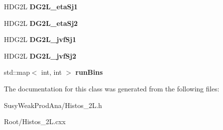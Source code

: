 \begin{DoxyCompactItemize}
\item 
\hypertarget{classHistos__2L_ab04be18de61abbcb5a5368342b02235e}{
HDG2L {\bfseries DG2L\_\-etaSj1}}
\label{classHistos__2L_ab04be18de61abbcb5a5368342b02235e}

\item 
\hypertarget{classHistos__2L_a9bb6f023aa09a9252ae2f4d6acc76082}{
HDG2L {\bfseries DG2L\_\-etaSj2}}
\label{classHistos__2L_a9bb6f023aa09a9252ae2f4d6acc76082}

\item 
\hypertarget{classHistos__2L_ab3182ec8c35d102e46105d077ee58020}{
HDG2L {\bfseries DG2L\_\-jvfSj1}}
\label{classHistos__2L_ab3182ec8c35d102e46105d077ee58020}

\item 
\hypertarget{classHistos__2L_a29edb97b293229d8b74f89e076f6b7d1}{
HDG2L {\bfseries DG2L\_\-jvfSj2}}
\label{classHistos__2L_a29edb97b293229d8b74f89e076f6b7d1}

\item 
\hypertarget{classHistos__2L_a9c1b9eac02370718702a0519ae92fef4}{
std::map$<$ int, int $>$ {\bfseries runBins}}
\label{classHistos__2L_a9c1b9eac02370718702a0519ae92fef4}

\end{DoxyCompactItemize}


The documentation for this class was generated from the following files:\begin{DoxyCompactItemize}
\item 
SusyWeakProdAna/Histos\_\-2L.h\item 
Root/Histos\_\-2L.cxx\end{DoxyCompactItemize}
